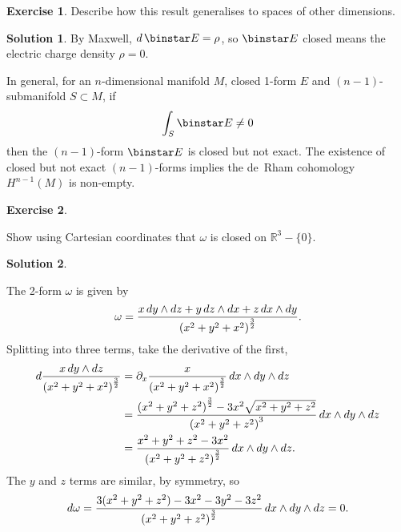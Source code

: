 \documentclass[11pt, a4paper]{report}
\theoremstyle{definition}
\newtheorem{exercise}{Exercise}[part]
\newtheorem{solution}{Solution}[part]
\newenvironment{ex}{\begin{exercise}}{\end{exercise}\pagebreak[1]}
\newenvironment{sol}{\begin{solution}}{\end{solution}\pagebreak[3]}
\renewcommand*{\d}{\ensuremath\mathop{}\mathopen{}d}
\renewcommand*{\star}{\ensuremath\mathop{}\mathopen\binstar\mathord{}}
\begin{document}
\begin{ex}

Describe how this result generalises to spaces of other dimensions.

\end{ex}

\begin{sol}

By Maxwell, $d \star E = \rho$, so $\star E$ closed means the electric charge density $\rho = 0$.

In general, for an $n$-dimensional manifold $M$, closed 1-form $E$ and $(n - 1)$-submanifold $S \subset M$, if
\[
    \int_S \star E \neq 0
\]
then the $(n-1)$-form $\star E$ is closed but not exact.
The existence of closed but not exact $(n - 1)$-forms implies the de~Rham cohomology $H^{n - 1}(M)$ is non-empty.

\end{sol}

\begin{ex}\label{ex:closedbutnotexact2form}

Show using Cartesian coordinates that $\omega$ is closed on $\mathbb{R}^3 - \{0\}$.

\end{ex}

\begin{sol}\label{sol:closedbutnotexact2form}

The 2-form $\omega$ is given by
\[
    \omega = \frac{x \d y \wedge dz + y \d z \wedge dx + z \d x \wedge dy}{{(x^2 + y^2 + x^2)}^\frac{3}{2}}.
\]
Splitting into three terms, take the derivative of the first,
\begin{align*}
    d \frac{x \d y \wedge dz}{{(x^2 + y^2 + x^2)}^\frac{3}{2}}
        &= \partial_x \frac{x}{{(x^2 + y^2 + x^2)}^\frac{3}{2}} \d x \wedge dy \wedge dz \\
        &= \frac{{(x^2 + y^2 + z^2)}^\frac{3}{2} - 3x^2 \sqrt{x^2 + y^2 + z^2}}{{(x^2 + y^2 + z^2)}^3} \d x \wedge dy \wedge dz \\
        &= \frac{x^2 + y^2 + z^2 - 3x^2}{{(x^2 + y^2 + z^2)}^\frac{3}{2}} \d x \wedge dy \wedge dz.
\end{align*}
The $y$ and $z$ terms are similar, by symmetry,
so
\[
    d\omega = \frac{3(x^2 + y^2 + z^2) - 3x^2 - 3y^2 - 3z^2}{{(x^2 + y^2 + z^2)}^\frac{3}{2}} \d x \wedge dy \wedge dz = 0.
\]

\end{sol}
\end{document}
